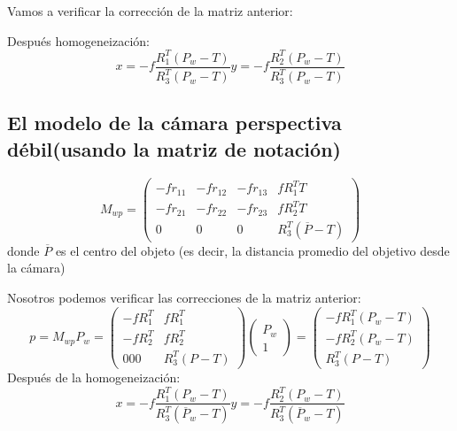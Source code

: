 Vamos a verificar la corrección de la matriz anterior:


Después homogeneización:
\begin{equation}
x=-f\frac{R_1^T\left(P_w-T\right)}{R_3^T\left(P_w-T\right)}
y=-f\frac{R_2^T\left(P_w-T\right)}{R_3^T\left(P_w-T\right)}
\end{equation}

\subsection{El modelo de la cámara perspectiva débil(usando la matriz de notación)}

\begin{equation}
M_{wp}=\begin{pmatrix}-fr_{11} & -fr_{12} & -fr_{13} & fR_1^TT\\-fr_{21} & -fr_{22} & -fr_{23} & fR_2^TT\\0 & 0 & 0 & R_3^T\left(\overline{P}-T\right) \end{pmatrix}
\end{equation}
donde $\overline{P}$ es el centro  del objeto (es decir, la distancia promedio del objetivo desde la cámara)

Nosotros podemos verificar las correcciones de la matriz anterior:
\begin{equation}
p=M_{wp}P_w=\begin{pmatrix} -fR_1^T  & fR_1^T \\-fR_2^T & fR_2^T \\0  0  0  & R_3^T\left(P-T\right)\end{pmatrix}\begin{pmatrix}P_w \\1 \end{pmatrix}=\begin{pmatrix} -fR_1^T\left(P_w-T\right)  \\-fR_2^T\left(P_w-T\right) \\R_3^T\left(P-T\right)\end{pmatrix}
\end{equation}
Después de la homogeneización:
\begin{equation}
x=-f\frac{R_1^T\left(P_w-T\right)}{R_3^T\left(\overline{P}_w-T\right)}
y=-f\frac{R_2^T\left(P_w-T\right)}{R_3^T\left(\overline{P}_w-T\right)}
\end{equation}

